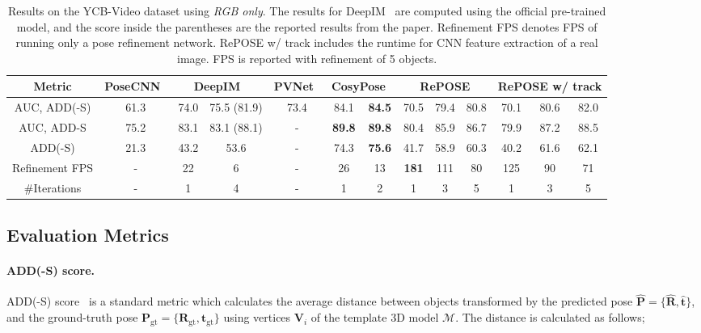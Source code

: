 \documentclass[10pt,twocolumn,letterpaper]{article}
\begin{document}
\begin{table*}[t]
\caption{Results on the YCB-Video dataset using \textit{RGB only}. The results for DeepIM~\cite{li2018deepim} are computed using the official pre-trained model, and the score inside the parentheses are the reported results from the paper. Refinement FPS denotes FPS of running only a pose refinement network. RePOSE w/ track includes the runtime for CNN feature extraction of a real image. FPS is reported with refinement of 5 objects.}
\centering
\scalebox{0.9} {
\begin{tabular}{c||cccccc||ccc|ccc}
\hline
Metric  & PoseCNN~\cite{xiang2018posecnn} & \multicolumn{2}{c}{DeepIM~\cite{li2018deepim}} & PVNet~\cite{peng2019pvnet} & \multicolumn{2}{c}{CosyPose~\cite{labbe2020}} & \multicolumn{3}{c}{RePOSE} & \multicolumn{3}{c}{RePOSE w/ track} \\  \hline
AUC, ADD(-S) & 61.3 & 74.0 & 75.5 (81.9) & 73.4 & 84.1 & \textbf{84.5} & 70.5 & 79.4 & 80.8 & 70.1 & 80.6 & 82.0 \\
AUC, ADD-S & 75.2 & 83.1 & 83.1 (88.1) & - & \textbf{89.8} & \textbf{89.8} & 80.4 & 85.9 & 86.7 & 79.9 & 87.2 & 88.5 \\
ADD(-S) & 21.3 & 43.2 & 53.6 & - & 74.3 & \textbf{75.6} & 41.7 & 58.9 & 60.3 & 40.2 & 61.6 & 62.1 \\ \hline
Refinement FPS  & - & 22 & 6 & - & 26 & 13 & \textbf{181} & 111 & 80 & 125 & 90 & 71 \\ \hline
\#Iterations & - & 1 & 4 & - & 1 & 2 & 1 & 3 & 5 & 1 & 3 & 5 \\
\hline
\end{tabular}
}
\label{tab:ycb}
\end{table*}

\subsection{Evaluation Metrics}

\paragraph{ADD(-S) score.}
\label{sec:ADDS}
ADD(-S) score~\cite{linemod,xiang2018posecnn} is a standard metric which calculates the average distance between objects transformed by the predicted pose $\mathbf{\hat{P}} = \{ \mathbf{\hat{R}},  \mathbf{\hat{t}} \}$, and the ground-truth pose $\mathbf{P}_\text{gt} = \{ \mathbf{R}_\text{gt},  \mathbf{t}_\text{gt} \}$ using  vertices $\mathbf{V}_i$ of the template 3D model $\mathcal{M}$. The distance is calculated as follows;
\end{document}
